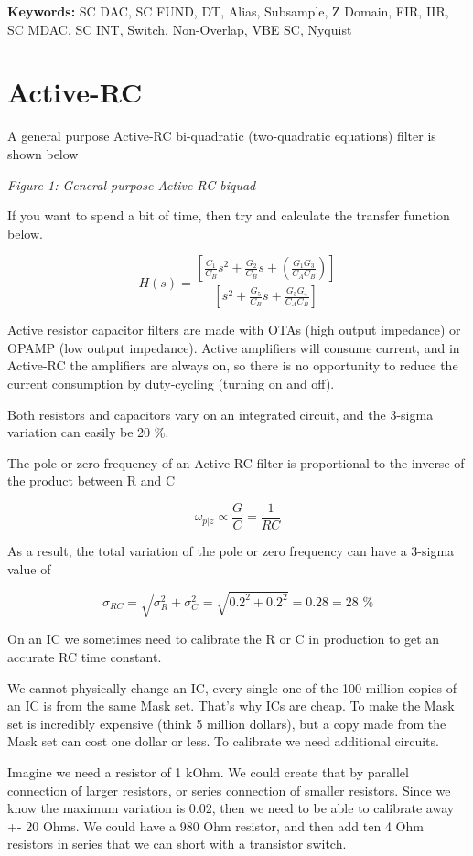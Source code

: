 \textbf{Keywords:} SC DAC, SC FUND, DT, Alias, Subsample, Z Domain, FIR,
IIR, SC MDAC, SC INT, Switch, Non-Overlap, VBE SC, Nyquist

\section{Active-RC}\label{active-rc}

A general purpose Active-RC bi-quadratic (two-quadratic equations)
filter is shown below


{
\centering
{}
}

\emph{Figure 1: General purpose Active-RC biquad}

If you want to spend a bit of time, then try and calculate the transfer
function below.

\[H(s) = \frac{\left[ \frac{C_1}{C_B}s^2 + \frac{G_2}{C_B}s + (\frac{G_1G_3}{C_A C_B})\right]}{\left[ s^2  + \frac{G_5}{C_B}s + \frac{G_3 G_4}{C_A C_B}\right]}\]

Active resistor capacitor filters are made with OTAs (high output
impedance) or OPAMP (low output impedance). Active amplifiers will
consume current, and in Active-RC the amplifiers are always on, so there
is no opportunity to reduce the current consumption by duty-cycling
(turning on and off).

Both resistors and capacitors vary on an integrated circuit, and the
3-sigma variation can easily be 20 \%.

The pole or zero frequency of an Active-RC filter is proportional to the
inverse of the product between R and C

\[\omega_{p\vert z} \propto \frac{G}{C} = \frac{1}{RC}\]

As a result, the total variation of the pole or zero frequency can have
a 3-sigma value of

\[ \sigma_{RC} = \sqrt{ \sigma_R^2 + \sigma_C^2 } = \sqrt{0.2^2 + 0.2^2} = 0.28 = 28 \text{ \%}\]

On an IC we sometimes need to calibrate the R or C in production to get
an accurate RC time constant.

We cannot physically change an IC, every single one of the 100 million
copies of an IC is from the same Mask set. That's why ICs are cheap. To
make the Mask set is incredibly expensive (think 5 million dollars), but
a copy made from the Mask set can cost one dollar or less. To calibrate
we need additional circuits.

Imagine we need a resistor of 1 kOhm. We could create that by parallel
connection of larger resistors, or series connection of smaller
resistors. Since we know the maximum variation is 0.02, then we need to
be able to calibrate away +- 20 Ohms. We could have a 980 Ohm resistor,
and then add ten 4 Ohm resistors in series that we can short with a
transistor switch.

